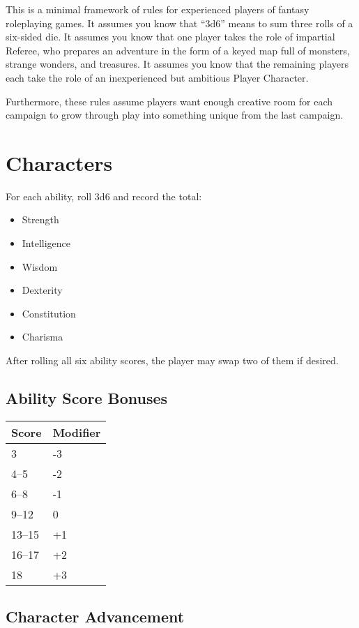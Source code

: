 This is a minimal framework of rules for experienced players of fantasy
roleplaying games. It assumes you know that ``3d6'' means to sum three
rolls of a six-sided die. It assumes you know that one player takes the
role of impartial Referee, who prepares an adventure in the form of a
keyed map full of monsters, strange wonders, and treasures. It assumes
you know that the remaining players each take the role of an
inexperienced but ambitious Player Character.

Furthermore, these rules assume players want enough creative room for
each campaign to grow through play into something unique from the last
campaign.

\section{Characters}\label{characters}

For each ability, roll 3d6 and record the total:

\begin{itemize}
\tightlist
\item
  Strength
\item
  Intelligence
\item
  Wisdom
\item
  Dexterity
\item
  Constitution
\item
  Charisma
\end{itemize}

After rolling all six ability scores, the player may swap two of them if
desired.

\subsection{Ability Score Bonuses}\label{ability-score-bonuses}

\begin{longtable}[]{@{}ll@{}}
\toprule
Score & Modifier\tabularnewline
\midrule
\endhead
3 & -3\tabularnewline
4--5 & -2\tabularnewline
6--8 & -1\tabularnewline
9--12 & 0\tabularnewline
13--15 & +1\tabularnewline
16--17 & +2\tabularnewline
18 & +3\tabularnewline
\bottomrule
\end{longtable}

\subsection{Character Advancement}\label{character-advancement}

